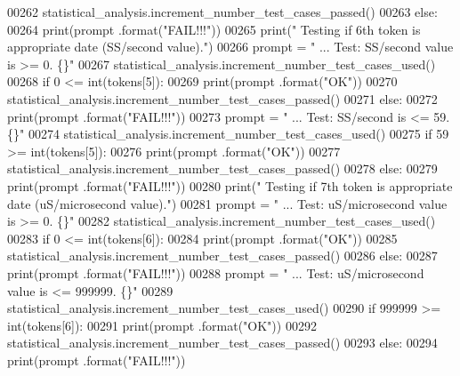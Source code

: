 \begin{DoxyCode}
00262             statistical\_analysis.increment\_number\_test\_cases\_passed()
00263         \textcolor{keywordflow}{else}:
00264             print(prompt .format(\textcolor{stringliteral}{"FAIL!!!"}))
00265         print(\textcolor{stringliteral}{" Testing if 6th token is appropriate date (SS/second value)."})
00266         prompt = \textcolor{stringliteral}{"  ... Test: SS/second value is >= 0.          \{\}"}
00267         statistical\_analysis.increment\_number\_test\_cases\_used()
00268         \textcolor{keywordflow}{if} 0 <= int(tokens[5]):
00269             print(prompt .format(\textcolor{stringliteral}{"OK"}))
00270             statistical\_analysis.increment\_number\_test\_cases\_passed()
00271         \textcolor{keywordflow}{else}:
00272             print(prompt .format(\textcolor{stringliteral}{"FAIL!!!"}))
00273         prompt = \textcolor{stringliteral}{"  ... Test: SS/second is <= 59.               \{\}"}
00274         statistical\_analysis.increment\_number\_test\_cases\_used()
00275         \textcolor{keywordflow}{if} 59 >= int(tokens[5]):
00276             print(prompt .format(\textcolor{stringliteral}{"OK"}))
00277             statistical\_analysis.increment\_number\_test\_cases\_passed()
00278         \textcolor{keywordflow}{else}:
00279             print(prompt .format(\textcolor{stringliteral}{"FAIL!!!"}))
00280         print(\textcolor{stringliteral}{" Testing if 7th token is appropriate date (uS/microsecond value)."})
00281         prompt = \textcolor{stringliteral}{"  ... Test: uS/microsecond value is >= 0.         \{\}"}
00282         statistical\_analysis.increment\_number\_test\_cases\_used()
00283         \textcolor{keywordflow}{if} 0 <= int(tokens[6]):
00284             print(prompt .format(\textcolor{stringliteral}{"OK"}))
00285             statistical\_analysis.increment\_number\_test\_cases\_passed()
00286         \textcolor{keywordflow}{else}:
00287             print(prompt .format(\textcolor{stringliteral}{"FAIL!!!"}))
00288         prompt = \textcolor{stringliteral}{"  ... Test: uS/microsecond value is <= 999999.        \{\}"}
00289         statistical\_analysis.increment\_number\_test\_cases\_used()
00290         \textcolor{keywordflow}{if} 999999 >= int(tokens[6]):
00291             print(prompt .format(\textcolor{stringliteral}{"OK"}))
00292             statistical\_analysis.increment\_number\_test\_cases\_passed()
00293         \textcolor{keywordflow}{else}:
00294             print(prompt .format(\textcolor{stringliteral}{"FAIL!!!"}))
\end{DoxyCode}
\hypertarget{classutilities_1_1generate__results__filename__tester_1_1generate__filename__tester_a7aae79997134dc7250949e725d92aedf}{}
